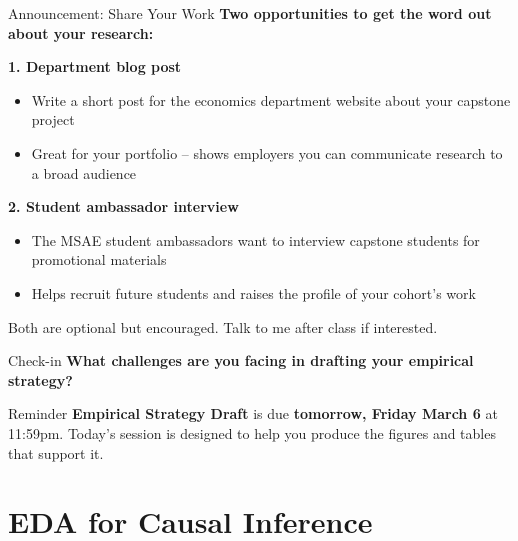 \begin{frame}{Announcement: Share Your Work}
  \textbf{Two opportunities to get the word out about your research:}

  \vspace{6pt}

  \textbf{1. Department blog post}
  \begin{itemize}
    \item Write a short post for the economics department website about your capstone project
    \item Great for your portfolio -- shows employers you can communicate research to a broad audience
  \end{itemize}

  \vspace{4pt}

  \textbf{2. Student ambassador interview}
  \begin{itemize}
    \item The MSAE student ambassadors want to interview capstone students for promotional materials
    \item Helps recruit future students and raises the profile of your cohort's work
  \end{itemize}

  \vspace{4pt}

  Both are optional but encouraged. Talk to me after class if interested.
\end{frame}

\begin{frame}{Check-in}
  \textbf{What challenges are you facing in drafting your empirical strategy?}
  \vspace{12pt}
  \begin{block}{Reminder}
    \textbf{Empirical Strategy Draft} is due \textbf{tomorrow, Friday March 6} at 11:59pm.
    Today's session is designed to help you produce the figures and tables that support it.
  \end{block}
\end{frame}


\section{EDA for Causal Inference}


